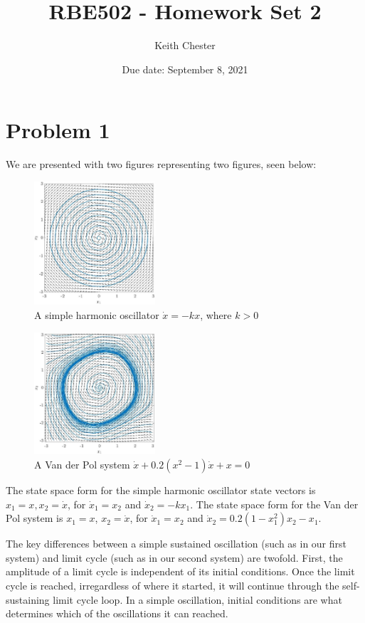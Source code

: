 \documentclass{article}
\title{RBE502 - Homework Set 2}
\author{Keith Chester}
\date{Due date: September 8, 2021}
\begin{document}
\maketitle

\section*{Problem 1}
We are presented with two figures representing two figures, seen below:

\begin{figure}[H]
    \centering
    \includegraphics[width = 0.4\textwidth]{figures/system1.jpg}
    \caption{A simple harmonic oscillator $\dot x = -kx$, where $k>0$}
    \label{fig:simple-harmonic-figure}
\end{figure}
\begin{figure}[H]
    \centering
    \includegraphics[width = 0.4\textwidth]{figures/system2.jpg}
    \caption{A Van der Pol system $\dot x + 0.2(x^2-1)\dot x + x = 0$}
    \label{fig:van-der-pol}
\end{figure}

The state space form for the simple harmonic oscillator state vectors is $x_1 = x , x_2=\dot x$, for $\dot x_1 = x_2$ and $\dot x_2 = -kx_1$. The state space form for the Van der Pol system is $x_1 = x$, $x_2 = \dot x$, for $\dot x_1 = x_2$ and $\dot x_2 = 0.2(1-x_1^2)x_2-x_1$.

The key differences between a simple sustained oscillation (such as in our first system) and limit cycle (such as in our second system) are twofold. First, the amplitude of a limit cycle is independent of its initial conditions. Once the limit cycle is reached, irregardless of where it started, it will continue through the self-sustaining limit cycle loop. In a simple oscillation, initial conditions are what determines which of the oscillations it can reached.
\end{document}
